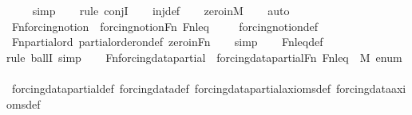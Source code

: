 \begin{isabellebody}
\ \ \ \isamarkupfalse%
\ simp\isanewline
\ \ \ \isamarkupfalse%
{\isacharparenleft}{\kern0pt}rule\ conjI{\isacharparenright}{\kern0pt}\isanewline
\ \ \isamarkupfalse%
\ inj{\isacharunderscore}{\kern0pt}def\isanewline
\ \ \isamarkupfalse%
\ zero{\isacharunderscore}{\kern0pt}in{\isacharunderscore}{\kern0pt}M\isanewline
\ \ \isamarkupfalse%
\ auto%
\endisatagproof
{\isafoldproof}%
%
\isadelimproof
\isanewline
%
\endisadelimproof
\isanewline
{}\isamarkupfalse%
\ Fn{\isacharunderscore}{\kern0pt}forcing{\isacharunderscore}{\kern0pt}notion\ {\isacharcolon}{\kern0pt}\ {\isachardoublequoteopen}forcing{\isacharunderscore}{\kern0pt}notion{\isacharparenleft}{\kern0pt}Fn{\isacharcomma}{\kern0pt}\ Fn{\isacharunderscore}{\kern0pt}leq{\isacharcomma}{\kern0pt}\ {}{\isacharparenright}{\kern0pt}{\isachardoublequoteclose}\isanewline
%
\isadelimproof
\ \ %
\endisadelimproof
%
\isatagproof
{}\isamarkupfalse%
\ forcing{\isacharunderscore}{\kern0pt}notion{\isacharunderscore}{\kern0pt}def\isanewline
\ \ \isamarkupfalse%
\ Fn{\isacharunderscore}{\kern0pt}partial{\isacharunderscore}{\kern0pt}ord\ partial{\isacharunderscore}{\kern0pt}order{\isacharunderscore}{\kern0pt}on{\isacharunderscore}{\kern0pt}def\ zero{\isacharunderscore}{\kern0pt}in{\isacharunderscore}{\kern0pt}Fn\isanewline
\ \ \isamarkupfalse%
\ simp\isanewline
\ \ \isamarkupfalse%
\ Fn{\isacharunderscore}{\kern0pt}leq{\isacharunderscore}{\kern0pt}def\isanewline
\ \ \isamarkupfalse%
{\isacharparenleft}{\kern0pt}rule\ ballI{\isacharcomma}{\kern0pt}\ simp{\isacharparenright}{\kern0pt}\isanewline
\ \ \isamarkupfalse%
%
\endisatagproof
{\isafoldproof}%
%
\isadelimproof
\isanewline
%
\endisadelimproof
\isanewline
{}\isamarkupfalse%
\ Fn{\isacharunderscore}{\kern0pt}forcing{\isacharunderscore}{\kern0pt}data{\isacharunderscore}{\kern0pt}partial\ {\isacharcolon}{\kern0pt}\ {\isachardoublequoteopen}forcing{\isacharunderscore}{\kern0pt}data{\isacharunderscore}{\kern0pt}partial{\isacharparenleft}{\kern0pt}Fn{\isacharcomma}{\kern0pt}\ Fn{\isacharunderscore}{\kern0pt}leq{\isacharcomma}{\kern0pt}\ {}{\isacharcomma}{\kern0pt}\ M{\isacharcomma}{\kern0pt}\ enum{\isacharparenright}{\kern0pt}{\isachardoublequoteclose}\ \isanewline
%
\isadelimproof
\ \ %
\endisadelimproof
%
\isatagproof
{}\isamarkupfalse%
\ forcing{\isacharunderscore}{\kern0pt}data{\isacharunderscore}{\kern0pt}partial{\isacharunderscore}{\kern0pt}def\ forcing{\isacharunderscore}{\kern0pt}data{\isacharunderscore}{\kern0pt}def\ forcing{\isacharunderscore}{\kern0pt}data{\isacharunderscore}{\kern0pt}partial{\isacharunderscore}{\kern0pt}axioms{\isacharunderscore}{\kern0pt}def\ forcing{\isacharunderscore}{\kern0pt}data{\isacharunderscore}{\kern0pt}axioms{\isacharunderscore}{\kern0pt}def\ \isanewline

\end{isabellebody}
